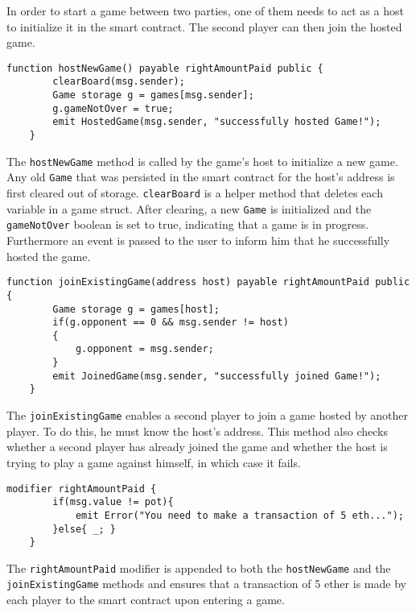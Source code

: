 \documentclass[10pt]{article}
\begin{document}
In order to start a game between two parties, one of them needs to act as a host to initialize it in the smart contract. The second player can then join the hosted game.
\begin{Verbatim}[fontsize=\small]
    function hostNewGame() payable rightAmountPaid public {
        clearBoard(msg.sender);
        Game storage g = games[msg.sender];
        g.gameNotOver = true;
        emit HostedGame(msg.sender, "successfully hosted Game!");
    }
\end{Verbatim}
The \texttt{hostNewGame} method is called by the game's host to initialize a new game. Any old \texttt{Game} that was persisted in the smart contract for the host's address is first cleared out of storage. \texttt{clearBoard} is a helper method that deletes each variable in a game struct. After clearing, a new \texttt{Game} is initialized and the \texttt{gameNotOver} boolean is set to true, indicating that a game is in progress. Furthermore an event is passed to the user to inform him that he successfully hosted the game.
\begin{Verbatim}[fontsize=\small]
    function joinExistingGame(address host) payable rightAmountPaid public {
        Game storage g = games[host];
        if(g.opponent == 0 && msg.sender != host)
        {
            g.opponent = msg.sender;
        }
        emit JoinedGame(msg.sender, "successfully joined Game!");
    }
\end{Verbatim}
The \texttt{joinExistingGame} enables a second player to join a game hosted by another player. To do this, he must know the host's address. This method also checks whether a second player has already joined the game and whether the host is trying to play a game against himself, in which case it fails.
\begin{Verbatim}[fontsize=\small]
    modifier rightAmountPaid {
        if(msg.value != pot){
            emit Error("You need to make a transaction of 5 eth...");
        }else{ _; }
    }
\end{Verbatim}
The \texttt{rightAmountPaid} modifier is appended to both the \texttt{hostNewGame} and the \texttt{joinExistingGame} methods and ensures that a transaction of 5 ether is made by each player to the smart contract upon entering a game.
\end{document}
